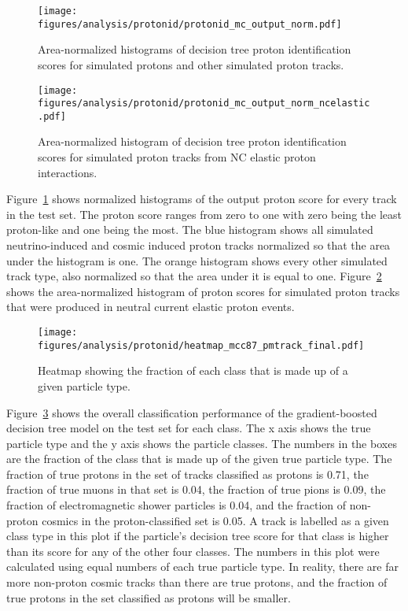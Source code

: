     \begin{figure}[ht]
      \centering
      \texttt{[image: figures/analysis/protonid/protonid\_mc\_output\_norm.pdf]}
      \caption{Area-normalized histograms of decision tree proton
      identification scores for simulated protons and other simulated proton
      tracks.}
      \label{fig:pidmcout}
    \end{figure}
    \begin{figure}[ht]
      \centering
      \texttt{[image: figures/analysis/protonid/protonid\_mc\_output\_norm\_ncelastic.pdf]}
      \caption{Area-normalized histogram of decision tree proton identification
      scores for simulated proton tracks from NC elastic proton interactions.}
      \label{fig:pidmcoutNCE}
    \end{figure}
    Figure~\ref{fig:pidmcout} shows normalized histograms of the output proton
    score for every track in the test set. The proton score ranges from zero to
    one with zero being the least proton-like and one being the most. The blue
    histogram shows all simulated neutrino-induced and cosmic induced proton
    tracks normalized so that the area under the histogram is one. The orange
    histogram shows every other simulated track type, also normalized so that
    the area under it is equal to one. Figure~\ref{fig:pidmcoutNCE} shows the
    area-normalized histogram of proton scores for simulated proton tracks that
    were produced in neutral current elastic proton events.

    \begin{figure}[ht]
      \centering
      \texttt{[image: figures/analysis/protonid/heatmap\_mcc87\_pmtrack\_final.pdf]}
      \caption{Heatmap showing the fraction of each class that is made up of a
      given particle type.}
      \label{fig:heatmap}
    \end{figure}
    Figure~\ref{fig:heatmap} shows the overall classification performance of
    the gradient-boosted decision tree model on the test set for each class.
    The x axis shows the true particle type and the y axis shows the particle
    classes. The numbers in the boxes are the fraction of the class that is
    made up of the given true particle type. The fraction of true protons in
    the set of tracks classified as protons is 0.71, the fraction of true muons
    in that set is 0.04, the fraction of true pions is 0.09, the fraction of
    electromagnetic shower particles is 0.04, and the fraction of non-proton
    cosmics in the proton-classified set is 0.05. A track is labelled as a
    given class type in this plot if the particle's decision tree score for
    that class is higher than its score for any of the other four classes.  The
    numbers in this plot were calculated using equal numbers of each true
    particle type. In reality, there are far more non-proton cosmic tracks than
    there are true protons, and the fraction of true protons in the set
    classified as protons will be smaller.

